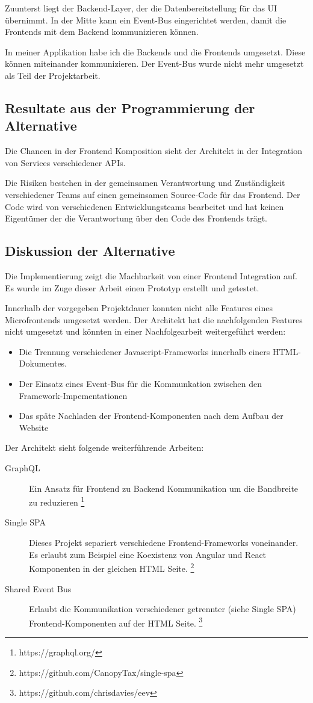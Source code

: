 Zuunterst liegt der Backend-Layer, der die Datenbereitstellung für das UI übernimmt. In der Mitte kann ein Event-Bus eingerichtet werden, damit die Frontends mit dem Backend kommunizieren können. \cite{Söderlund2017}

In meiner Applikation habe ich die Backends und die Frontends umgesetzt. Diese können miteinander kommunizieren. Der Event-Bus wurde nicht mehr umgesetzt als Teil der Projektarbeit.

\subsection{Resultate aus der Programmierung der Alternative}
Die Chancen in der Frontend Komposition  sieht der Architekt in der Integration von Services verschiedener APIs. 

Die  Risiken bestehen in der gemeinsamen Verantwortung und Zuständigkeit verschiedener Teams auf einen gemeinsamen Source-Code für das Frontend. Der Code wird von verschiedenen Entwicklungsteams bearbeitet und hat keinen Eigentümer der die Verantwortung über den Code des Frontends trägt.  

\subsection{Diskussion der Alternative}

Die Implementierung zeigt die Machbarkeit von einer Frontend Integration auf. Es wurde im Zuge dieser Arbeit einen Prototyp erstellt und getestet. 

Innerhalb der vorgegeben Projektdauer konnten nicht alle Features eines Microfrontends umgesetzt werden. Der Architekt hat die nachfolgenden Features nicht umgesetzt und könnten in einer Nachfolgearbeit weitergeführt werden:

\begin{itemize}
    \item Die Trennung verschiedener Javascript-Frameworks innerhalb einers HTML-Dokumentes.
    \item Der Einsatz eines Event-Bus für die Kommunkation zwischen den Framework-Impementationen
    \item Das späte Nachladen der Frontend-Komponenten nach dem Aufbau der Website 
\end{itemize}

Der  Architekt sieht folgende weiterführende Arbeiten:
\begin{description}
    \item[GraphQL] Ein Ansatz für Frontend zu Backend Kommunikation um die Bandbreite zu reduzieren \footnote{https://graphql.org/}
    \item[Single SPA] Dieses Projekt separiert verschiedene Frontend-Frameworks voneinander. Es erlaubt zum Beispiel eine Koexistenz von Angular und React Komponenten in der gleichen HTML Seite. \footnote{https://github.com/CanopyTax/single-spa}
    \item[Shared Event Bus] Erlaubt die Kommunikation verschiedener getrennter (siehe Single SPA) Frontend-Komponenten auf der HTML Seite.  \footnote{https://github.com/chrisdavies/eev}
\end{description}